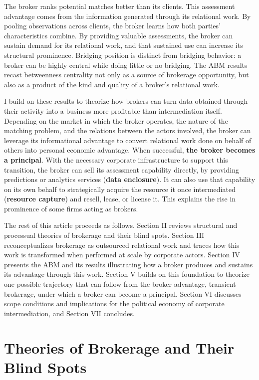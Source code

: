 \documentclass[
]{article}
\begin{document}
The broker ranks potential matches better than its clients. This assessment advantage comes from the information generated through its relational work. By pooling observations across clients, the broker learns how both parties' characteristics combine. By providing valuable assessments, the broker can sustain demand for its relational work, and that sustained use can increase its structural prominence. Bridging position is distinct from bridging behavior: a broker can be highly central while doing little or no bridging. The ABM results recast betweenness centrality not only as a source of brokerage opportunity, but also as a product of the kind and quality of a broker's relational work.

I build on these results to theorize how brokers can turn data obtained through their activity into a business more profitable than intermediation itself. Depending on the market in which the broker operates, the nature of the matching problem, and the relations between the actors involved, the broker can leverage its informational advantage to convert relational work done on behalf of others into personal economic advantage. When successful, \textbf{the broker becomes a principal}. With the necessary corporate infrastructure to support this transition, the broker can sell its assessment capability directly, by providing predictions or analytics services (\textbf{data enclosure}). It can also use that capability on its own behalf to strategically acquire the resource it once intermediated (\textbf{resource capture}) and resell, lease, or license it. This explains the rise in prominence of some firms acting as brokers.

The rest of this article proceeds as follows. Section II reviews structural and processual theories of brokerage and their blind spots. Section III reconceptualizes brokerage as outsourced relational work and traces how this work is transformed when performed at scale by corporate actors. Section IV presents the ABM and its results illustrating how a broker produces and sustains its advantage through this work. Section V builds on this foundation to theorize one possible trajectory that can follow from the broker advantage, transient brokerage, under which a broker can become a principal. Section VI discusses scope conditions and implications for the political economy of corporate intermediation, and Section VII concludes.

\section{Theories of Brokerage and Their Blind Spots}
\label{sec:brokerage-theory}
\end{document}
